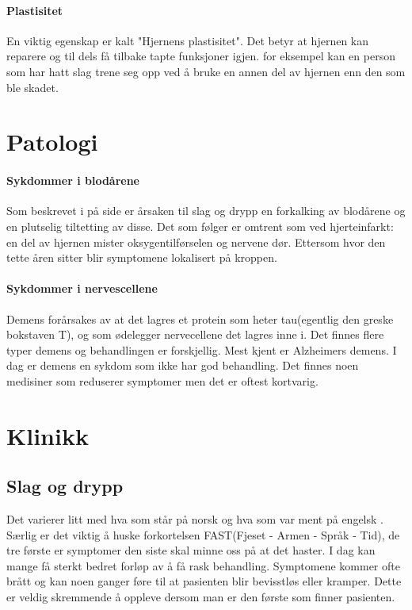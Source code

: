 			\paragraph{Plastisitet\\}
				En viktig egenskap er kalt "Hjernens plastisitet". Det betyr at hjernen kan reparere og til dels få tilbake tapte funksjoner igjen. for eksempel kan en person som har hatt slag trene seg opp ved å bruke en annen del av hjernen enn den som ble skadet. 	
		\section{Patologi}
			\paragraph{Sykdommer i blodårene\\}
				Som beskrevet i  på side \pageref{sec:athero} %
				er årsaken til slag og drypp en forkalking av blodårene og en plutselig tiltetting av disse\cite{FA-athero}. Det som følger er omtrent som ved hjerteinfarkt: en del av hjernen mister oksygentilførselen og nervene dør. Ettersom hvor den tette åren sitter blir symptomene lokalisert på kroppen.
			\paragraph{Sykdommer i nervescellene\\}
				Demens forårsakes av at det lagres et protein som heter tau(egentlig den greske bokstaven T), og som ødelegger nervecellene det lagres inne i. Det finnes flere typer demens og behandlingen er forskjellig. Mest kjent er Alzheimers demens. I dag er demens en sykdom som ikke har god behandling. Det finnes noen medisiner som reduserer symptomer men det er oftest kortvarig. 
		\section{Klinikk}
			\subsection{Slag og drypp}
				Det varierer litt med hva som står på norsk og hva som var ment på engelsk\cite{!!!}%
				. Særlig er det viktig å huske forkortelsen FAST(Fjeset - Armen - Språk - Tid), de tre første er symptomer den siste skal minne oss på at det haster. I dag kan mange få sterkt bedret forløp av å få rask behandling. Symptomene kommer ofte brått og kan noen ganger føre til at pasienten blir bevisstløs eller kramper. Dette er veldig skremmende å oppleve dersom man er den første som finner pasienten. 
